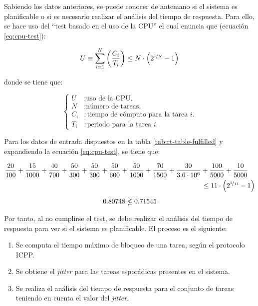 Sabiendo los datos anteriores, se puede conocer de antemano si el sistema es
planificable o si es necesario realizar el análisis del tiempo de respuesta. Para
ello, se hace uso del ``test basado en el uso de la CPU'' el cual enuncia que
(ecuación \ref{eq:cpu-test}):

\begin{equation}\label{eq:cpu-test}
  U \equiv \sum_{i = 1}^N \left(\frac{C_i}{T_i}\right) \le N \cdot \left(2^{\nicefrac{1}{N}} - 1\right)
\end{equation}

donde se tiene que:

\begin{equation*}
  \left\{
  \begin{aligned}
    U   & : \text{uso de la CPU.}                       \\
    N   & : \text{número de tareas.}                    \\
    C_i & : \text{tiempo de cómputo para la tarea $i$.} \\
    T_i & : \text{periodo para la tarea $i$.}
  \end{aligned}
  \right.
\end{equation*}

Para los datos de entrada dispuestos en la tabla \ref{tab:rt-table-fulfilled} y expandiendo
la ecuación \ref{eq:cpu-test}, se tiene que:

\begin{gather}\label{eq:cpu-test-done}
  \begin{multlined}
    \frac{20}{100} + \frac{15}{1000} + \frac{40}{700} + \frac{50}{300} + \frac{50}{300}%
    + \frac{50}{600} + \frac{50}{1000} + \frac{70}{1500} + \frac{30}{3.6 \cdot 10^6}%
    + \frac{100}{5000} + \frac{10}{5000} \\
    \le 11 \cdot \left(2^{\nicefrac{1}{11}} - 1\right)
  \end{multlined} \\[1ex]
  0.80748 \nleq 0.71545
\end{gather}

Por tanto, al no cumplirse el test, se debe realizar el análisis del tiempo de respuesta
para ver si el sistema es planificable. El proceso es el siguiente:

\begin{enumerate}
  \item Se computa el tiempo máximo de bloqueo de una tarea, según el protocolo \ac{ICPP}.
  \item Se obtiene el \textit{jitter} para las tareas esporádicas presentes en el sistema.
  \item Se realiza el análisis del tiempo de respuesta para el conjunto de tareas teniendo
        en cuenta el valor del \textit{jitter}.
\end{enumerate}

